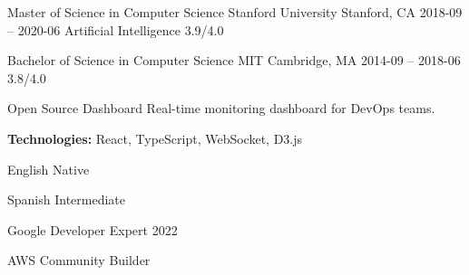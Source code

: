\documentclass[11pt, a4paper]{awesome-cv}
\begin{document}
\cveducation
  {Master of Science in Computer Science}
  {Stanford University}
  {Stanford, CA}
  {2018-09 -- 2020-06}
  {Artificial Intelligence}
  {3.9/4.0}

\cveducation
  {Bachelor of Science in Computer Science}
  {MIT}
  {Cambridge, MA}
  {2014-09 -- 2018-06}
  {}
  {3.8/4.0}








\cvproject
  {Open Source Dashboard}
  {Real-time monitoring dashboard for DevOps teams.}

\begin{cvitems}
  \item \textbf{Technologies:} React, TypeScript, WebSocket, D3.js
\end{cvitems}


\begin{cvskills}

  \cvskill
    {English}
    {Native}

  \cvskill
    {Spanish}
    {Intermediate}

\end{cvskills}


\begin{cvhonors}

  \cvhonor
    {Google Developer Expert 2022}
    {}{}{}

  \cvhonor
    {AWS Community Builder}
    {}{}{}

\end{cvhonors}
\end{document}

